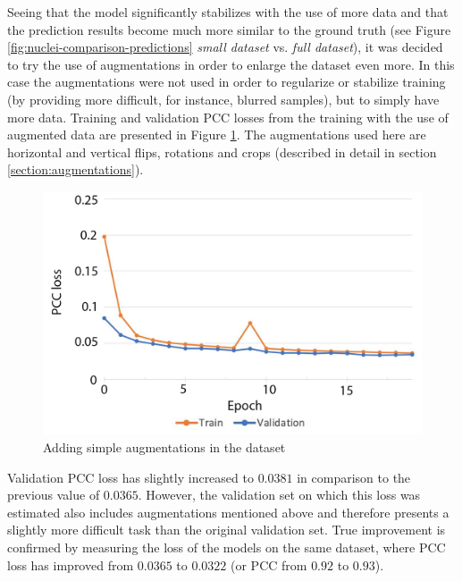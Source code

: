Seeing that the model significantly stabilizes with the use of more data and that the prediction results become much more similar to the ground truth (see Figure \ref{fig:nuclei-comparison-predictions} \textit{small dataset} vs. \textit{full dataset}), it was decided to try the use of augmentations in order to enlarge the dataset even more. In this case the augmentations were not used in order to regularize or stabilize training (by providing more difficult, for instance, blurred samples), but to simply have more data. Training and validation PCC losses from the training with the use of augmented data are presented in Figure \ref{fig:no-reg-augmented}. The augmentations used here are horizontal and vertical flips, rotations and crops (described in detail in section \ref{section:augmentations}).
\begin{figure}[H]
	\begin{center}
		\includegraphics[width=0.5\linewidth]{bilder/nuclei/no-reg-but-aug.png}
		\caption{Adding simple augmentations in the dataset}\label{fig:no-reg-augmented}
	\end{center}
\end{figure}
Validation PCC loss has slightly increased to $0.0381$ in comparison to the previous value of $0.0365$. However, the validation set on which this loss was estimated also includes augmentations mentioned above and therefore presents a slightly more difficult task than the original validation set. True improvement is confirmed by measuring the loss of the models on the same dataset, where PCC loss has improved from $0.0365$ to $0.0322$ (or PCC from $0.92$ to $0.93$).

